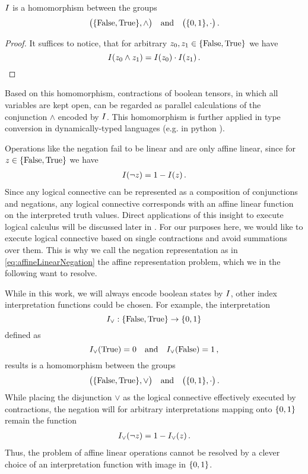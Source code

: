 \begin{lemma}
	$I$ is a homomorphism between the groups	
		\[ \big(\{\mathrm{False},\mathrm{True}\},\land\big) \quad \text{and} \quad \big(\{0,1\},\cdot\big) \, . \]
\end{lemma}
\begin{proof}
	It suffices to notice, that for arbitrary $z_{0},z_{1}\in\{\mathrm{False},\mathrm{True}\}$ we have
		\[ I(z_{0}\land z_{1}) 
		= I(z_{0}) \cdot I(z_{1})  \, . \]
\end{proof}
	
Based on this homomorphism, contractions of boolean tensors, in which all variables are kept open, can be regarded as parallel calculations of the conjunction $\land$ encoded by $I$.
This homomorphism is further applied in type conversion in dynamically-typed languages (e.g. in $\mathrm{python}$ \cite{python_software_foundation_python_2025}).

Operations like the negation fail to be linear and are only affine linear, since for $z\in\{\mathrm{False},\mathrm{True}\}$ we have
\begin{align}\label{eq:affineLinearNegation}
 	I(\lnot z) = 1 - I(z)  \, . 
\end{align}
Since any logical connective can be represented as a composition of conjunctions and negations, any logical connective corresponds with an affine linear function on the interpreted truth values.
Direct applications of this insight to execute logical calculus will be discussed later in .
For our purposes here, we would like to execute logical connective based on single contractions and avoid summations over them.
This is why we call the negation representation as in \eqref{eq:affineLinearNegation} the affine representation problem, which we in the following want to resolve.

While in this work, we will always encode boolean states by $I$, other index interpretation functions could be chosen.
For example, the interpretation
	\[ I_{\lor}:\{\mathrm{False},\mathrm{True}\}\rightarrow\{0,1\} \]
defined as
    	\[ I_{\lor}(\mathrm{True}) = 0 \quad \text{and} \quad I_{\lor}(\mathrm{False}) = 1 \, , \]
results is a homomorphism between the groups	
	\[ \big(\{\mathrm{False},\mathrm{True}\},\lor\big) \quad \text{and} \quad \big(\{0,1\},\cdot\big) \, . \]
While placing the disjunction $\lor$ as the logical connective effectively executed by contractions, the negation will for arbitrary interpretations mapping onto $\{0,1\}$ remain the function %
\begin{align*}
 	I_{\lor}(\lnot z) = 1 - I_{\lor}(z)  \, . 
\end{align*}
Thus, the problem of affine linear operations cannot be resolved by a clever choice of an interpretation function with image in $\{0,1\}$. 


